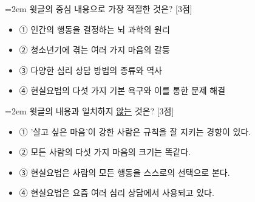 \documentclass[10pt,a4paper]{article}
\newcommand{\qnum}[1]{%
  \tikz[baseline=(num.base)]{%
    \node[circle, fill=numCircle, text=white, inner sep=0pt,
          minimum size=18pt, font=\small\bfseries] (num) {#1};%
  }%
}
\newcommand{\pts}[1]{%
  \hfill\textcolor{ptsBadge}{[#1점]}%
}
\begin{document}
\vspace{3mm}
\begin{minipage}{\columnwidth}
{\hangindent=2em
\qnum{25}\enspace 윗글의 중심 내용으로 가장 적절한 것은? \pts{3}
\par}

\vspace{3mm}
\begin{itemize}[leftmargin=2.5em, labelsep=0.3em, label={}, itemsep=4pt, parsep=1pt, topsep=0pt]
  \item ① 인간의 행동을 결정하는 뇌 과학의 원리
  \item ② 청소년기에 겪는 여러 가지 마음의 갈등
  \item ③ 다양한 심리 상담 방법의 종류와 역사
  \item ④ 현실요법의 다섯 가지 기본 욕구와 이를 통한 문제 해결
\end{itemize}
\end{minipage}
\vspace{4mm}

\vspace{4mm}
\begin{minipage}{\columnwidth}
{\hangindent=2em
\qnum{26}\enspace 윗글의 내용과 일치하지 \uline{않는} 것은? \pts{3}
\par}

\vspace{3mm}
\begin{itemize}[leftmargin=2.5em, labelsep=0.3em, label={}, itemsep=4pt, parsep=1pt, topsep=0pt]
  \item ① '살고 싶은 마음'이 강한 사람은 규칙을 잘 지키는 경향이 있다.
  \item ② 모든 사람의 다섯 가지 마음의 크기는 똑같다.
  \item ③ 현실요법은 사람의 모든 행동을 스스로의 선택으로 본다.
  \item ④ 현실요법은 요즘 여러 심리 상담에서 사용되고 있다.
\end{itemize}
\end{minipage}
\vspace{4mm}
\end{document}
